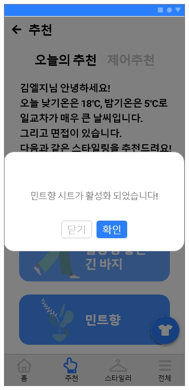 \documentclass[conference]{IEEEtran}
\begin{document}
\begin{enumerate}
     \centerline{\includegraphics[scale=0.25]{assets/추천4.jpg}
}
\end{enumerate}
\end{document}

